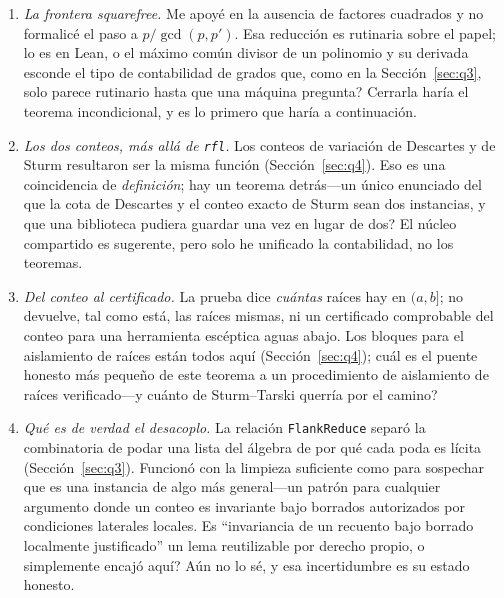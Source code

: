 \documentclass[11pt]{article}
\newcommand{\lean}[1]{\texttt{#1}}
\begin{document}
\begin{enumerate}\itemsep3pt
\item \emph{La frontera squarefree.} Me apoy\'e en la ausencia de factores cuadrados y no formalic\'e
el paso a $p/\gcd(p,p')$. Esa reducci\'on es rutinaria sobre el papel; \textquestiondown lo es en
Lean, o el m\'aximo com\'un divisor de un polinomio y su derivada esconde el tipo de contabilidad de
grados que, como en la Secci\'on~\ref{sec:q3}, solo parece rutinario hasta que una m\'aquina pregunta?
Cerrarla har\'ia el teorema incondicional, y es lo primero que har\'ia a continuaci\'on.

\item \emph{Los dos conteos, m\'as all\'a de \lean{rfl}.} Los conteos de variaci\'on de Descartes y de
Sturm resultaron ser la misma funci\'on (Secci\'on~\ref{sec:q4}). Eso es una coincidencia de
\emph{definici\'on}; \textquestiondown hay un teorema detr\'as---un \'unico enunciado del que la cota
de Descartes y el conteo exacto de Sturm sean dos instancias, y que una biblioteca pudiera guardar una
vez en lugar de dos? El n\'ucleo compartido es sugerente, pero solo he unificado la contabilidad, no
los teoremas.

\item \emph{Del conteo al certificado.} La prueba dice \emph{cu\'antas} ra\'ices hay en $(a,b]$; no
devuelve, tal como est\'a, las ra\'ices mismas, ni un certificado comprobable del conteo para una
herramienta esc\'eptica aguas abajo. Los bloques para el aislamiento de ra\'ices est\'an todos aqu\'i
(Secci\'on~\ref{sec:q4}); \textquestiondown cu\'al es el puente honesto m\'as peque\~no de este
teorema a un procedimiento de aislamiento de ra\'ices verificado---y cu\'anto de Sturm--Tarski
\cite{libudan} querr\'ia por el camino?

\item \emph{Qu\'e es de verdad el desacoplo.} La relaci\'on \lean{FlankReduce} separ\'o la
combinatoria de podar una lista del \'algebra de por qu\'e cada poda es l\'icita
(Secci\'on~\ref{sec:q3}). Funcion\'o con la limpieza suficiente como para sospechar que es una
instancia de algo m\'as general---un patr\'on para cualquier argumento donde un conteo es invariante
bajo borrados autorizados por condiciones laterales locales. \textquestiondown Es ``invariancia de un
recuento bajo borrado localmente justificado'' un lema reutilizable por derecho propio, o simplemente
encaj\'o aqu\'i? A\'un no lo s\'e, y esa incertidumbre es su estado honesto.
\end{enumerate}
\end{document}

